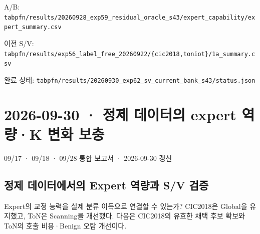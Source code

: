 \par\noindent \textbullet\enspace A/\allowbreak{}B: \texttt{tabpfn/\allowbreak{}\allowbreak{}r\allowbreak{}esults/\allowbreak{}\allowbreak{}2\allowbreak{}0260928\_\allowbreak{}\allowbreak{}exp59\_\allowbreak{}\allowbreak{}re\allowbreak{}sidual\_\allowbreak{}\allowbreak{}o\allowbreak{}racle\_\allowbreak{}\allowbreak{}s4\allowbreak{}3/\allowbreak{}\allowbreak{}expert\allowbreak{}\_\allowbreak{}\allowbreak{}capabil\allowbreak{}ity/\allowbreak{}\allowbreak{}expe\allowbreak{}rt\_\allowbreak{}\allowbreak{}summa\allowbreak{}ry.\allowbreak{}csv}


\par\noindent \textbullet\enspace 이전 S/\allowbreak{}V: \texttt{tabpfn/\allowbreak{}\allowbreak{}r\allowbreak{}esults/\allowbreak{}\allowbreak{}e\allowbreak{}xp56\_\allowbreak{}\allowbreak{}lab\allowbreak{}el\_\allowbreak{}\allowbreak{}free\_\allowbreak{}\allowbreak{}20260922\allowbreak{}/\allowbreak{}\allowbreak{}\{\allowbreak{}cic201\allowbreak{}8,\allowbreak{}toniot\allowbreak{}\}\allowbreak{}/\allowbreak{}\allowbreak{}1a\_\allowbreak{}\allowbreak{}sum\allowbreak{}mary.\allowbreak{}csv\allowbreak{}}


\par\noindent \textbullet\enspace 완료 상태: \texttt{tabpfn/\allowbreak{}\allowbreak{}r\allowbreak{}esults/\allowbreak{}\allowbreak{}2\allowbreak{}0260930\_\allowbreak{}\allowbreak{}exp62\_\allowbreak{}\allowbreak{}sv\allowbreak{}\_\allowbreak{}\allowbreak{}current\allowbreak{}\_\allowbreak{}\allowbreak{}bank\_\allowbreak{}\allowbreak{}s4\allowbreak{}3/\allowbreak{}\allowbreak{}status\allowbreak{}.\allowbreak{}json}




\section{2026-09-30 · 정제 데이터의 expert 역량·K 변화 보충}
\label{report:expert_supplement}
09/\allowbreak{}17 · 09/\allowbreak{}18 · 09/\allowbreak{}28 통합 보고서 · 2026-09-30 갱신

\subsection*{정제 데이터에서의 Expert 역량과 S/\allowbreak{}V 검증}
Expert의 교정 능력을 실제 분류 이득으로 연결할 수 있는가? CIC2018은 Global을 유지했고, ToN은 Scanning을 개선했다. 다음은 CIC2018의 유효한 채택 후보 확보와 ToN의 호출 비용·Benign 오탐 개선이다.

